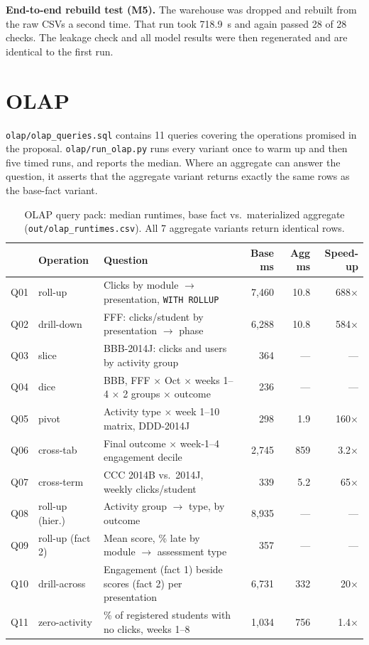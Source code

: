 \documentclass[10pt,letterpaper]{article}
\renewcommand{\tt}[1]{\texttt{#1}}
\begin{document}
\textbf{End-to-end rebuild test (M5).} The warehouse was dropped and rebuilt from the raw CSVs a second time. That
run took 718.9~s and again passed 28 of 28 checks. The leakage check and all model results were then regenerated
and are identical to the first run.

\section{OLAP}
\tt{olap/olap\_queries.sql} contains 11 queries covering the operations promised in the proposal.
\tt{olap/run\_olap.py} runs every variant once to warm up and then five timed runs, and reports the median. Where
an aggregate can answer the question, it asserts that the aggregate variant returns exactly the same rows as the
base-fact variant.

\begin{table}[H]\centering\small
\caption{OLAP query pack: median runtimes, base fact vs.\ materialized aggregate (\tt{out/olap\_runtimes.csv}). All 7 aggregate variants return identical rows.}\label{tab:olap}
\begin{tabular}{@{}llp{2.9in}rrr@{}}
\toprule
& \textbf{Operation} & \textbf{Question} & \textbf{Base ms} & \textbf{Agg ms} & \textbf{Speed-up} \\ \midrule
Q01 & roll-up & Clicks by module $\rightarrow$ presentation, \tt{WITH ROLLUP} & 7,460 & 10.8 & 688$\times$ \\
Q02 & drill-down & FFF: clicks/student by presentation $\rightarrow$ phase & 6,288 & 10.8 & 584$\times$ \\
Q03 & slice & BBB-2014J: clicks and users by activity group & 364 & --- & --- \\
Q04 & dice & BBB, FFF $\times$ Oct $\times$ weeks 1--4 $\times$ 2 groups $\times$ outcome & 236 & --- & --- \\
Q05 & pivot & Activity type $\times$ week 1--10 matrix, DDD-2014J & 298 & 1.9 & 160$\times$ \\
Q06 & cross-tab & Final outcome $\times$ week-1--4 engagement decile & 2,745 & 859 & 3.2$\times$ \\
Q07 & cross-term & CCC 2014B vs.\ 2014J, weekly clicks/student & 339 & 5.2 & 65$\times$ \\
Q08 & roll-up (hier.) & Activity group $\rightarrow$ type, by outcome & 8,935 & --- & --- \\
Q09 & roll-up (fact 2) & Mean score, \% late by module $\rightarrow$ assessment type & 357 & --- & --- \\
Q10 & drill-across & Engagement (fact 1) beside scores (fact 2) per presentation & 6,731 & 332 & 20$\times$ \\
Q11 & zero-activity & \% of registered students with no clicks, weeks 1--8 & 1,034 & 756 & 1.4$\times$ \\
\bottomrule
\end{tabular}
\end{table}
\end{document}
